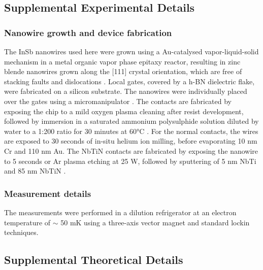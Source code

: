 \subsection{Supplemental Experimental Details}
\subsubsection{Nanowire growth and device fabrication}
The \mbox{InSb} nanowires used here were grown using a Au-catalysed vapor-liquid-solid mechanism in a metal organic vapor phase epitaxy reactor, resulting in zinc blende nanowires grown \mbox{along} the [111] crystal orientation, which are free of stacking \mbox{faults} and dislocations \cite{Car2014}.
Local gates, covered by a h-BN dielectric flake, were fabricated on a silicon substrate.
The nanowires were individually placed over the gates using a micromanipulator \cite{Flohr2011}.
The contacts are fabricated by exposing the chip to a mild oxygen plasma cleaning after resist development, followed by immersion in a saturated ammonium polysulphide solution diluted by water to a 1:200 ratio for 30 minutes at \ang{60}C \cite{Suyatin2007}.
For the normal contacts, the wires are exposed to 30 seconds of in-situ helium ion milling, before evaporating 10 nm Cr and 110 nm Au.
The NbTiN contacts are fabricated by exposing the nanowire to 5 seconds or Ar plasma etching at 25 W, followed by sputtering of 5 nm NbTi and 85 nm NbTiN \cite{HardGap,BalSc}.

\subsubsection{Measurement details}
The measurements were performed in a dilution refrigerator at an electron temperature of $\sim$ 50 mK  using a three-axis vector magnet and standard lockin techniques.

\subsection{Supplemental Theoretical Details}
